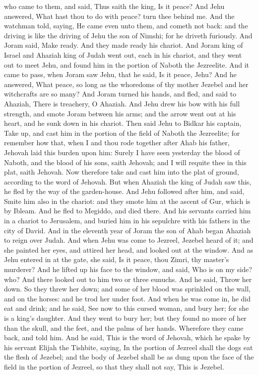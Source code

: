 who came to them, and said, Thus saith the king, Is it peace? And Jehu answered, What hast thou to do with peace? turn thee behind me. And the watchman told, saying, He came even unto them, and cometh not back: and the driving is like the driving of Jehu the son of Nimshi; for he driveth furiously.  And Joram said, Make ready. And they made ready his chariot. And Joram king of Israel and Ahaziah king of Judah went out, each in his chariot, and they went out to meet Jehu, and found him in the portion of Naboth the Jezreelite. And it came to pass, when Joram saw Jehu, that he said, Is it peace, Jehu? And he answered, What peace, so long as the whoredoms of thy mother Jezebel and her witchcrafts are so many? And Joram turned his hands, and fled, and said to Ahaziah, There is treachery, O Ahaziah. And Jehu drew his bow with his full strength, and smote Joram between his arms; and the arrow went out at his heart, and he sunk down in his chariot. Then said Jehu to Bidkar his captain, Take up, and cast him in the portion of the field of Naboth the Jezreelite; for remember how that, when I and thou rode together after Ahab his father, Jehovah laid this burden upon him: Surely I have seen yesterday the blood of Naboth, and the blood of his sons, saith Jehovah; and I will requite thee in this plat, saith Jehovah. Now therefore take and cast him into the plat of ground, according to the word of Jehovah.  But when Ahaziah the king of Judah saw this, he fled by the way of the garden-house. And Jehu followed after him, and said, Smite him also in the chariot: and they smote him at the ascent of Gur, which is by Ibleam. And he fled to Megiddo, and died there. And his servants carried him in a chariot to Jerusalem, and buried him in his sepulchre with his fathers in the city of David.  And in the eleventh year of Joram the son of Ahab began Ahaziah to reign over Judah.  And when Jehu was come to Jezreel, Jezebel heard of it; and she painted her eyes, and attired her head, and looked out at the window. And as Jehu entered in at the gate, she said, Is it peace, thou Zimri, thy master’s murderer? And he lifted up his face to the window, and said, Who is on my side? who? And there looked out to him two or three eunuchs. And he said, Throw her down. So they threw her down; and some of her blood was sprinkled on the wall, and on the horses: and he trod her under foot. And when he was come in, he did eat and drink; and he said, See now to this cursed woman, and bury her; for she is a king’s daughter. And they went to bury her; but they found no more of her than the skull, and the feet, and the palms of her hands. Wherefore they came back, and told him. And he said, This is the word of Jehovah, which he spake by his servant Elijah the Tishbite, saying, In the portion of Jezreel shall the dogs eat the flesh of Jezebel; and the body of Jezebel shall be as dung upon the face of the field in the portion of Jezreel, so that they shall not say, This is Jezebel. 

